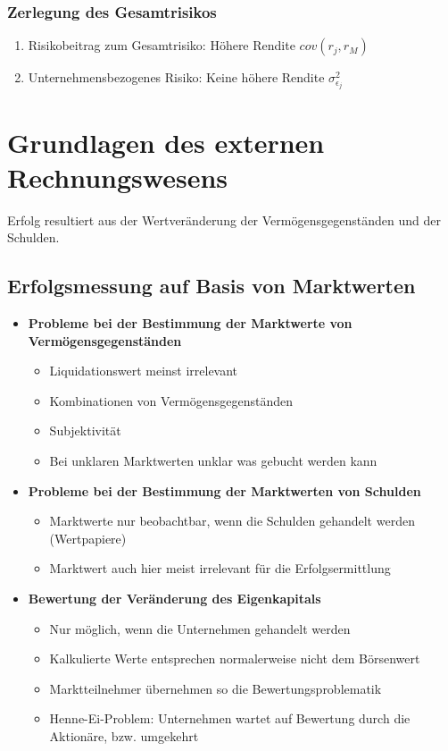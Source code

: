 \subsubsection{Zerlegung des Gesamtrisikos}
\begin{enumerate}
	\item Risikobeitrag zum Gesamtrisiko: Höhere Rendite \(cov(r_j,r_M)\)
	\item Unternehmensbezogenes Risiko: Keine höhere Rendite \(\sigma^2_{\epsilon_j}\)
\end{enumerate}



\section{Grundlagen des externen Rechnungswesens}
Erfolg resultiert aus der Wertveränderung der Vermögensgegenständen und der Schulden.

\subsection{Erfolgsmessung auf Basis von Marktwerten}
\begin{itemize}
	\item \textbf{Probleme bei der Bestimmung der Marktwerte von Vermögensgegenständen}
	\begin{itemize}
		\item Liquidationswert meinst irrelevant
		\item Kombinationen von Vermögensgegenständen
		\item Subjektivität
		\item Bei unklaren Marktwerten unklar was gebucht werden kann
	\end{itemize}
	\item \textbf{Probleme bei der Bestimmung der Marktwerten von Schulden}
	\begin{itemize}
		\item Marktwerte nur beobachtbar, wenn die Schulden gehandelt werden (Wertpapiere)
		\item Marktwert auch hier meist irrelevant für die Erfolgsermittlung
	\end{itemize}
	\item \textbf{Bewertung der Veränderung des Eigenkapitals}
	\begin{itemize}
		\item Nur möglich, wenn die Unternehmen gehandelt werden
		\item Kalkulierte Werte entsprechen normalerweise nicht dem Börsenwert
		\item Marktteilnehmer übernehmen so die Bewertungsproblematik
		\item Henne-Ei-Problem: Unternehmen wartet auf Bewertung durch die Aktionäre, bzw. umgekehrt
	\end{itemize}
\end{itemize}


